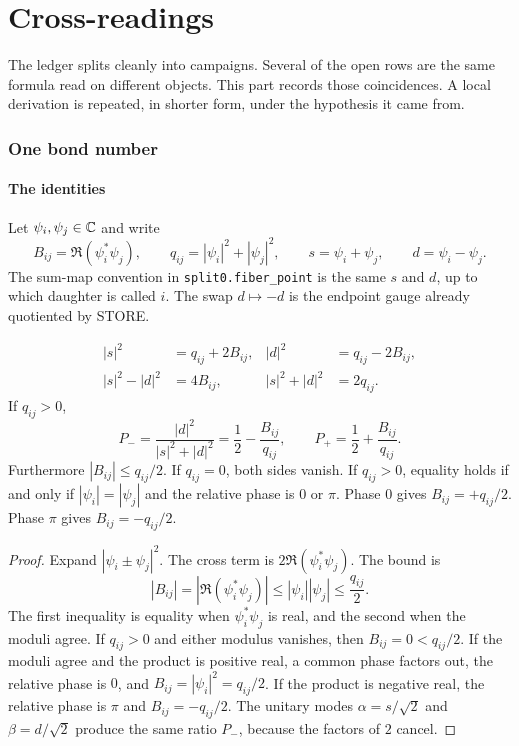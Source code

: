 \part{Cross-readings}
\label{part:cross}

The ledger splits cleanly into campaigns.
Several of the open rows are the same formula read on different objects.
This part records those coincidences.
A local derivation is repeated, in shorter form, under the hypothesis it came from.

\section{One bond number}
\label{sec:bond}

\subsection{The identities}

Let \(\psi_i,\psi_j\in\mathbb{C}\) and write
\begin{equation}
\label{eq:Bq}
B_{ij}=\Re(\psi_i^*\psi_j),\qquad
q_{ij}=|\psi_i|^2+|\psi_j|^2,\qquad
s=\psi_i+\psi_j,\qquad
d=\psi_i-\psi_j.
\end{equation}
The sum-map convention in \texttt{split0.fiber\_point} is the same \(s\) and \(d\),
up to which daughter is called \(i\).
The swap \(d\mapsto -d\) is the endpoint gauge already quotiented by STORE.

\begin{lemma}
\label{lem:bond-expand}
\begin{align*}
|s|^2&=q_{ij}+2B_{ij},&
|d|^2&=q_{ij}-2B_{ij},\\
|s|^2-|d|^2&=4B_{ij},&
|s|^2+|d|^2&=2q_{ij}.
\end{align*}
If \(q_{ij}>0\),
\begin{equation}
\label{eq:Pminus}
P_-=\frac{|d|^2}{|s|^2+|d|^2}
=\frac12-\frac{B_{ij}}{q_{ij}},\qquad
P_+=\frac12+\frac{B_{ij}}{q_{ij}}.
\end{equation}
Furthermore \(|B_{ij}|\le q_{ij}/2\).
If \(q_{ij}=0\), both sides vanish.
If \(q_{ij}>0\), equality holds if and only if \(|\psi_i|=|\psi_j|\) and the
relative phase is \(0\) or \(\pi\).
Phase \(0\) gives \(B_{ij}=+q_{ij}/2\).
Phase \(\pi\) gives \(B_{ij}=-q_{ij}/2\).
\end{lemma}

\begin{proof}
Expand \(|\psi_i\pm\psi_j|^2\).
The cross term is \(2\Re(\psi_i^*\psi_j)\).
The bound is
\[
|B_{ij}|
=|\Re(\psi_i^*\psi_j)|
\le|\psi_i||\psi_j|
\le\frac{q_{ij}}{2}.
\]
The first inequality is equality when \(\psi_i^*\psi_j\) is real, and the second
when the moduli agree.
If \(q_{ij}>0\) and either modulus vanishes, then \(B_{ij}=0<q_{ij}/2\).
If the moduli agree and the product is positive real, a common phase
factors out, the relative phase is \(0\), and
\(B_{ij}=|\psi_i|^2=q_{ij}/2\).
If the product is negative real, the relative phase is \(\pi\) and
\(B_{ij}=-q_{ij}/2\).
The unitary modes \(\alpha=s/\sqrt{2}\) and \(\beta=d/\sqrt{2}\)
produce the same ratio \(P_-\), because the factors of \(2\) cancel.
\end{proof}

